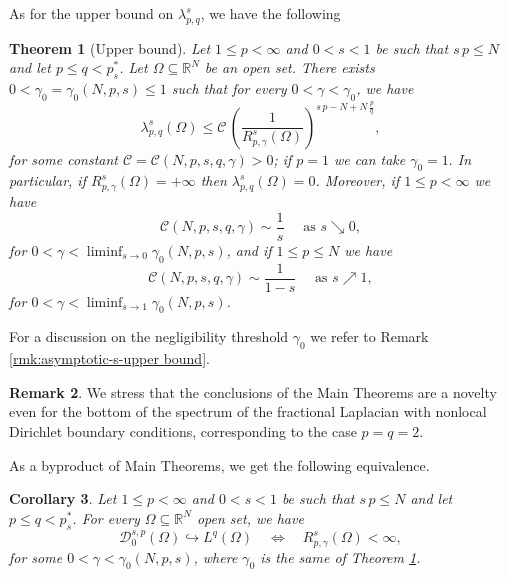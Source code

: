 \documentclass{amsart}
\newtheorem{theorem}{Theorem}[section]
\newtheorem{corollary}[theorem]{Corollary}
\theoremstyle{definition}
\newtheorem{remark}[theorem]{Remark}
\numberwithin{equation}{section}
\begin{document}
	
	As for the upper bound on $\lambda_{p, q}^s$, we have the following
	
	
	\begin{theorem}[Upper bound]
		\label{thm:upper-bound}
		Let $1 \le p < \infty$ and $0 < s < 1$ be such that $s\,p\leq N$ and let $p \le q < p^*_s$. Let $\Omega \subseteq \mathbb{R}^N$ be an open set. There exists $0 < \gamma_0 = \gamma_0(N,p,s) \le 1$ such that for every $0 < \gamma < \gamma_0$, we have   \begin{equation}\label{main:upper-bound p-q}
			\lambda_{p,q}^s(\Omega)\leq \mathcal{C}\,\left(\frac{1}{R^s_{p, \gamma}(\Omega)}\right)^{s\,p-N+N\,\frac{p}{q}},
		\end{equation}
		for some constant $\mathcal{C} = \mathcal{C}(N,p,s, q, \gamma) > 0$; if $p=1$ we can take $\gamma_0 =1.$ In particular, if $R^s_{p, \gamma}(\Omega) = +\infty$ then $\lambda^s_{p,q}(\Omega) = 0$.  Moreover, if $1 \le p < \infty$ we have 
		\[
		\mathcal{C}\left(N,p,s, q, \gamma\right) \sim \frac{1}{s} \quad\mbox{ as } s \searrow 0,
		\]
	for $0 < \gamma < \liminf_{s \to 0} \gamma_0\left(N,p,s\right)$, and if $1 \le p \le N$ we have 
		\[
		\mathcal{C}\left(N,p,s, q, \gamma\right) \sim \frac{1}{1- s} \quad\mbox{ as } s \nearrow 1,
		\]
		for $ 0 < \gamma < \liminf_{s \to 1} \gamma_0\left(N,p,s\right)$.
	\end{theorem}
	
	For a discussion on the negligibility threshold $\gamma_0$ we refer to Remark \ref{rmk:asymptotic-s-upper bound}. 
	
	\begin{remark}
		We stress that the conclusions of the Main Theorems are a novelty even for the bottom of the spectrum of the fractional Laplacian with nonlocal Dirichlet boundary conditions, corresponding to the case $p = q =2$.  
	\end{remark}
	
	As a byproduct of Main Theorems, we get the following equivalence.
	\begin{corollary} \label{cor:embedding-ext}
		Let $1 \le p < \infty$ and $0 < s < 1$ be such that $s\,p \leq N$ and let $p \le q < p^*_s$. For every $\Omega \subseteq \mathbb{R}^N$ open set, we have 
		\[
		\mathcal{D}^{s,p}_0(\Omega) \hookrightarrow L^q(\Omega) \quad \Longleftrightarrow \quad R^s_{p, \gamma}(\Omega) < \infty,
		\]  
		for some $0 < \gamma < \gamma_0(N,p,s)$, where $\gamma_0$ is the same of Theorem \ref{thm:upper-bound}. 
	\end{corollary} 
	
\end{document}

